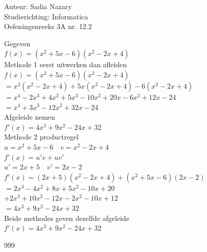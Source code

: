 \documentclass[a4paper]{article}
\begin{document}
\large Auteur: Sadia Nazary \\
\large Studierichting: Informatica \\
\large Oefeningenreeks 3A nr. 12.2 \\

\medskip

\normalsize

Gegeven \\

$f(x)=(x^2+5x-6)(x^2-2x+4)$ \\

Methode 1 eerst uitwerken dan afleiden \\

$f(x)=(x^2+5x-6)(x^2-2x+4)$ \\

$=x^2(x^2-2x+4)+5x(x^2-2x+4)-6(x^2-2x+4)$ \\

$=x^4-2x^3+4x^2+5x^3-10x^2+20x-6x^2+12x-24$ \\

$=x^4+3x^3-12x^2+32x-24$ \\

Afgeleide nemen \\

$f'(x)=4x^3+9x^2-24x+32$ \\

Methode 2 productregel \\

$u=x^2+5x-6 \quad v=x^2-2x+4$ \\

$f'(x)=u'v+uv'$ \\

$u'=2x+5 \quad v'=2x-2$ \\

$f'(x)=(2x+5)(x^2-2x+4)+(x^2+5x-6)(2x-2)$ \\

$=2x^3-4x^2+8x+5x^2-10x+20$ \\

$+2x^3+10x^2-12x-2x^2-10x+12$ \\

$=4x^3+9x^2-24x+32$ \\

Beide methodes geven dezelfde afgeleide \\

$f'(x)=4x^3+9x^2-24x+32$ \\

\begin{thebibliography}{999}
\end{thebibliography}
\end{document}
